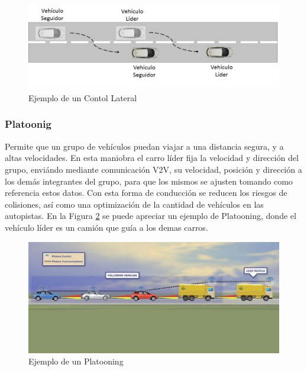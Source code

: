 \begin{figure}[!h]
	\centering
		\includegraphics[scale=0.6]{Imagenes/cl}
		\caption{Ejemplo de un Contol Lateral}
		\label{fig:cl}
	\end{figure}	

 

\subsubsection{Platoonig}

Permite que un grupo de vehículos puedan viajar a una distancia segura, y a altas velocidades. En esta maniobra el carro líder fija la velocidad y dirección del grupo, enviándo mediante comunicación V2V, su velocidad, posición y dirección a los demás integrantes del grupo, para que los mismos se ajusten tomando como referencia estos datos. Con esta forma de conducción se reducen los riesgos de colisiones, así como una optimización de la cantidad de vehículos en las autopistas. En la Figura \ref{fig:plat} se puede apreciar un ejemplo de Platooning, donde el vehículo líder es un camión que guía a los demas carros.\\

\begin{figure}[!h]
	\centering
		\includegraphics[scale=0.6]{Imagenes/plat}
		\caption[Ejemplo de un Platooning]{Ejemplo de un Platooning \protect\footnotemark}
		\label{fig:plat}
	\end{figure}	

